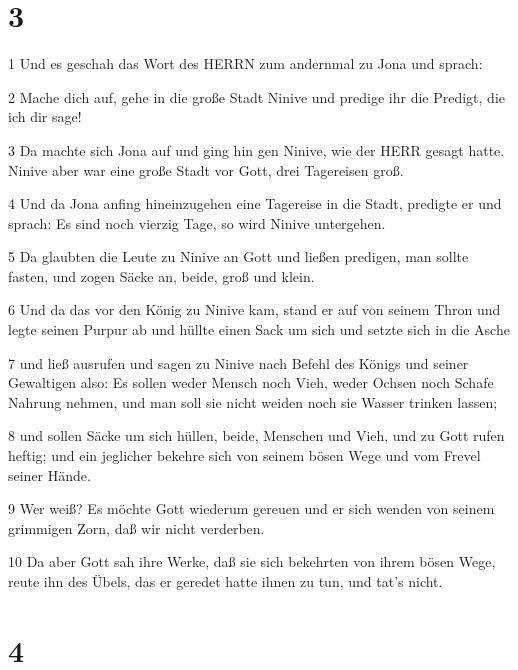 \chapter{3}

\par 1 Und es geschah das Wort des HERRN zum andernmal zu Jona und sprach:
\par 2 Mache dich auf, gehe in die große Stadt Ninive und predige ihr die Predigt, die ich dir sage!
\par 3 Da machte sich Jona auf und ging hin gen Ninive, wie der HERR gesagt hatte. Ninive aber war eine große Stadt vor Gott, drei Tagereisen groß.
\par 4 Und da Jona anfing hineinzugehen eine Tagereise in die Stadt, predigte er und sprach: Es sind noch vierzig Tage, so wird Ninive untergehen.
\par 5 Da glaubten die Leute zu Ninive an Gott und ließen predigen, man sollte fasten, und zogen Säcke an, beide, groß und klein.
\par 6 Und da das vor den König zu Ninive kam, stand er auf von seinem Thron und legte seinen Purpur ab und hüllte einen Sack um sich und setzte sich in die Asche
\par 7 und ließ ausrufen und sagen zu Ninive nach Befehl des Königs und seiner Gewaltigen also: Es sollen weder Mensch noch Vieh, weder Ochsen noch Schafe Nahrung nehmen, und man soll sie nicht weiden noch sie Wasser trinken lassen;
\par 8 und sollen Säcke um sich hüllen, beide, Menschen und Vieh, und zu Gott rufen heftig; und ein jeglicher bekehre sich von seinem bösen Wege und vom Frevel seiner Hände.
\par 9 Wer weiß? Es möchte Gott wiederum gereuen und er sich wenden von seinem grimmigen Zorn, daß wir nicht verderben.
\par 10 Da aber Gott sah ihre Werke, daß sie sich bekehrten von ihrem bösen Wege, reute ihn des Übels, das er geredet hatte ihnen zu tun, und tat's nicht.

\chapter{4}


